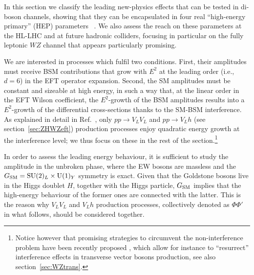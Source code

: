 
In this section we classify the leading new-physics effects that can be tested
in di-boson channels, showing that they can be encapsulated in four real ``high-energy primary'' (HEP) parameters~\cite{Franceschini:2017ab} .
We also assess the reach on these parameters at the HL-LHC and at future hadronic colliders, focusing in particular
on the fully leptonic $WZ$ channel that appears particularly promising.

We are interested in processes which fulfil two conditions. First, their amplitudes must receive BSM contributions that grow with $E^2$ at the leading order (i.e., $d=6$) in the EFT operator expansion. Second, the  SM amplitudes must be constant and sizeable
at high energy, in such a way that, at the linear order in the EFT Wilson coefficient,  the $E^2$-growth of the BSM amplitudes
results into a $E^2$-growth of the differential cross-sections thanks to the SM-BSM interference. 
As explained in detail in Ref.~\cite{Franceschini:2017ab}, only $pp \to V_LV_L $ and $pp \to V_L h$ (see section~\ref{sec:ZHWZeft}) production
processes  enjoy quadratic energy growth at the interference level; we thus focus on these in the rest of the
section.\footnote{Notice however that promising strategies to circumvent the non-interference problem have been recently proposed \cite{Panico:2017frx,Azatov:2017kzw}, which allow for instance to ``resurrect'' interference effects in transverse vector bosons production, see also section~\ref{sec:WZtrans}.}

In order to assess the leading energy behaviour, it is sufficient to study the amplitude in the unbroken phase,
where the EW bosons are massless and the $G_{\rm{SM}}={\textrm{SU}}(2)_L\times{\textrm{U}}(1)_Y$ symmetry is exact.
Given that the Goldstone bosons live in the Higgs doublet $H$, together with the Higgs particle, $G_{\rm{SM}}$ implies
that the high-energy behaviour of the former ones are connected with the latter. This is the reason why $V_LV_L$
and $V_Lh$ production processes, collectively denoted as $\Phi\Phi'$ in what follows, should be considered together.

